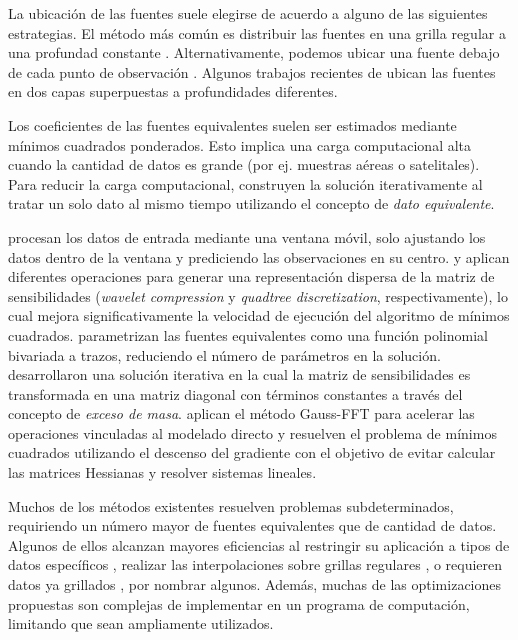 La ubicación de las fuentes suele elegirse de acuerdo a alguno de las
siguientes estrategias.
El método más común es distribuir las fuentes en una grilla regular a una
profundad constante \citep[por~ej.,~][]{leao1989, barnes2011, oliveira2013}.
Alternativamente, podemos ubicar una fuente debajo de cada punto de observación
\citep[por~ej.,~][]{cordell1992, siqueira2017}.
Algunos trabajos recientes de \citet{li2020} ubican las fuentes en dos capas
superpuestas a profundidades diferentes.

Los coeficientes de las fuentes equivalentes suelen ser estimados mediante
mínimos cuadrados ponderados.
Esto implica una carga computacional alta cuando la cantidad de datos es grande
(por ej. muestras aéreas o satelitales).
Para reducir la carga computacional, \citet{mendonca1994} construyen la
solución iterativamente al tratar un solo dato al mismo tiempo utilizando el
concepto de \emph{dato equivalente}.

\citet{leao1989} procesan los datos de entrada mediante una ventana móvil, solo
ajustando los datos dentro de la ventana y prediciendo las observaciones en su
centro.
\citet{li2010} y \citet{barnes2011} aplican diferentes operaciones para generar
una representación dispersa de la matriz de sensibilidades (\emph{wavelet
compression} y \emph{quadtree discretization}, respectivamente), lo cual mejora
significativamente la velocidad de ejecución del algoritmo de mínimos
cuadrados.
\citet{oliveira2013} parametrizan las fuentes equivalentes como una función
polinomial bivariada a trazos, reduciendo el número de parámetros en la
solución.
\citet{siqueira2017} desarrollaron una solución iterativa en la cual la matriz
de sensibilidades es transformada en una matriz diagonal con términos
constantes a través del concepto de \emph{exceso de masa}.
\citet{jirigalatu2019} aplican el método Gauss-FFT para acelerar las
operaciones vinculadas al modelado directo y resuelven el problema de mínimos
cuadrados utilizando el descenso del gradiente con el objetivo de evitar
calcular las matrices Hessianas y resolver sistemas lineales.


Muchos de los métodos existentes resuelven problemas subdeterminados,
requiriendo un número mayor de fuentes equivalentes que de cantidad de datos.
Algunos de ellos alcanzan mayores eficiencias al
restringir su aplicación a tipos de datos específicos \citep{siqueira2017},
realizar las interpolaciones sobre grillas regulares \citep{leao1989},
o requieren datos ya grillados \citep{takahashi2020},
por nombrar algunos.
Además, muchas de las optimizaciones propuestas son complejas de implementar en
un programa de computación, limitando que sean ampliamente utilizados.

